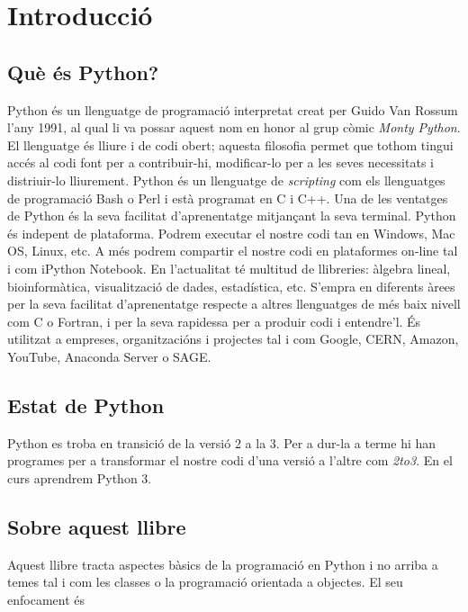 


\chapter{Introducció}
\setcounter{page}{1}
\pagestyle{plain}   %


\section{Què és Python?}

Python és un llenguatge de programació interpretat creat per Guido Van Rossum l'any 1991, al qual li va possar aquest nom en honor al grup còmic \emph{Monty Python}. El llenguatge és lliure i de codi obert; aquesta filosofia permet que tothom tingui accés al codi font per a contribuir-hi, modificar-lo per a les seves necessitats i distriuir-lo lliurement. Python és un llenguatge de \emph{scripting} com els llenguatges de programació Bash o Perl i està programat en C i C++. Una de les ventatges de Python és la seva facilitat d'aprenentatge mitjançant la seva terminal. Python és indepent de plataforma. Podrem executar el nostre codi tan en Windows, Mac OS, Linux, etc. A més podrem compartir el nostre codi en plataformes on-line tal i com iPython Notebook. En l'actualitat té multitud de llibreries: àlgebra lineal, bioinformàtica, visualització de dades, estadística, etc. S'empra en diferents àrees per la seva facilitat d'aprenentatge respecte a altres llenguatges de més baix nivell com C o Fortran, i per la seva rapidessa per a produir codi i entendre'l. És utilitzat a empreses, organitzacións i projectes tal i com Google, CERN, Amazon, YouTube, Anaconda Server o SAGE. 
  

\section{Estat de Python}

Python es troba en transició de la versió 2 a la 3. Per a dur-la a terme hi han programes per a transformar el nostre codi d'una versió a l'altre com \emph{2to3}. En el curs aprendrem Python 3.


\section{Sobre aquest llibre}


Aquest llibre tracta aspectes bàsics de la programació en Python i no arriba a temes tal i com les classes o la programació orientada a objectes. El seu enfocament és 

